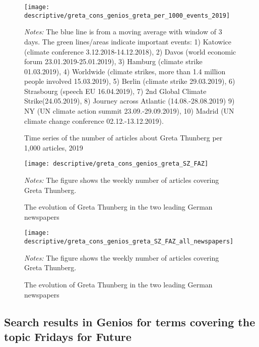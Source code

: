 \documentclass[11pt, a4paper]{article} %
\begin{document}
\begin{figure}[H]\centering
	\caption{Time series of the number of articles about Greta Thunberg per 1,000 articles, 2019}
	\texttt{[image: descriptive/greta\_cons\_genios\_greta\_per\_1000\_events\_2019]}
	\begin{minipage}{\linewidth}
		\scriptsize{\emph{Notes:} The blue line is from a moving average with window of 3 days. The green lines/areas indicate important events: 1) Katowice (climate conference 3.12.2018-14.12.2018), 2) Davos (world economic forum 23.01.2019-25.01.2019), 3) Hamburg (climate strike 01.03.2019), 4) Worldwide (climate strikes, more than 1.4 million people involved 15.03.2019), 5) Berlin (climate strike 29.03.2019), 6) Strasbourg (speech EU 16.04.2019), 7) 2nd Global Climate Strike(24.05.2019),	8) Journey across Atlantic (14.08.-28.08.2019) 9) NY (UN climate action summit 23.09.-29.09.2019), 10) Madrid (UN climate change conference 02.12.-13.12.2019).}
	\end{minipage}
\end{figure}


\begin{figure}[H]\centering
	\caption{The evolution of Greta Thunberg in the two leading German newspapers}
	\texttt{[image: descriptive/greta\_cons\_genios\_greta\_SZ\_FAZ]}
	\begin{minipage}{\linewidth}
		\scriptsize{\emph{Notes:} The figure shows the weekly number of articles covering Greta Thunberg.}
	\end{minipage}
\end{figure}
\begin{figure}[H]\centering
	\caption{The evolution of Greta Thunberg in the two leading German newspapers}
	\texttt{[image: descriptive/greta\_cons\_genios\_greta\_SZ\_FAZ\_all\_newspapers]}
	\begin{minipage}{\linewidth}
		\scriptsize{\emph{Notes:} The figure shows the weekly number of articles covering Greta Thunberg.}
	\end{minipage}
\end{figure}


\newpage
\subsection{Search results in Genios for terms covering the topic Fridays for Future}
\end{document}
